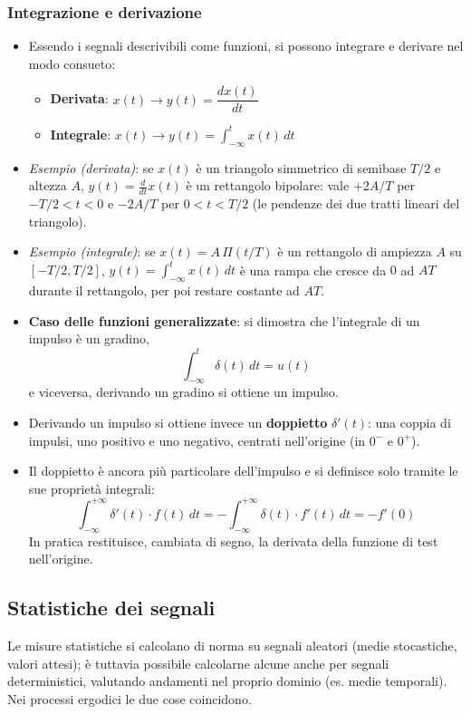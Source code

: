 \documentclass[12pt, a4paper]{article}
\begin{document}
\subsubsection{Integrazione e derivazione}
\begin{itemize}
    \item Essendo i segnali descrivibili come funzioni, si possono integrare e derivare nel modo consueto:
    \begin{itemize}
        \item[] \textbf{Derivata}: $x(t) \to y(t) = \dfrac{dx(t)}{dt}$
        \item[] \textbf{Integrale}: $x(t) \to y(t) = \displaystyle\int_{-\infty}^{t} x(t)\,dt$
    \end{itemize}
    \item \textit{Esempio (derivata)}: se $x(t)$ è un triangolo simmetrico di semibase $T/2$ e altezza $A$, $y(t)=\frac{d}{dt}x(t)$ è un rettangolo bipolare: vale $+2A/T$ per $-T/2<t<0$ e $-2A/T$ per $0<t<T/2$ (le pendenze dei due tratti lineari del triangolo).
    \item \textit{Esempio (integrale)}: se $x(t) = A\,\Pi(t/T)$ è un rettangolo di ampiezza $A$ su $[-T/2,T/2]$, $y(t)=\int_{-\infty}^t x(t)\,dt$ è una rampa che cresce da $0$ ad $AT$ durante il rettangolo, per poi restare costante ad $AT$.
    \item \textbf{Caso delle funzioni generalizzate}: si dimostra che l'integrale di un impulso è un gradino,
    $$\int_{-\infty}^{t} \delta(t)\,dt = u(t)$$
    e viceversa, derivando un gradino si ottiene un impulso.
    \item Derivando un impulso si ottiene invece un \textbf{doppietto} $\delta'(t)$: una coppia di impulsi, uno positivo e uno negativo, centrati nell'origine (in $0^-$ e $0^+$).
    \item Il doppietto è ancora più particolare dell'impulso e si definisce solo tramite le sue proprietà integrali:
    $$\int_{-\infty}^{+\infty} \delta'(t)\cdot f(t)\,dt = -\int_{-\infty}^{+\infty}\delta(t)\cdot f'(t)\,dt = -f'(0)$$
    In pratica restituisce, cambiata di segno, la derivata della funzione di test nell'origine.
\end{itemize}

\subsection{Statistiche dei segnali}

Le misure statistiche si calcolano di norma su segnali aleatori (medie stocastiche, valori attesi); è tuttavia possibile calcolarne alcune anche per segnali deterministici, valutando andamenti nel proprio dominio (es. medie temporali). Nei processi ergodici le due cose coincidono.
\end{document}
